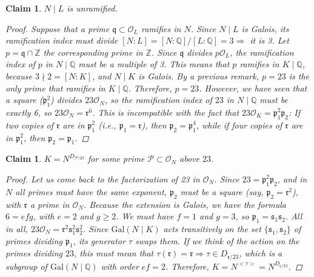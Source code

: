 \documentclass[11pt]{article}
\newtheorem{claim}[theorem]{Claim}
\theoremstyle{definition}
\begin{document}
    \begin{claim}
        $N \mid L$ is unramified.
        \begin{proof}

            
            Suppose that a prime $\mathfrak{q} \subset \mathcal{O}_L$ ramifies in $N$.
            Since $N \mid L$ is Galois, its ramification index must divide $[N:L] = [N : \mathbb{Q}] / [L : \mathbb{Q}] = 3 \Rightarrow$ it is 3.
            Let $p = \mathfrak{q} \cap \mathbb{Z}$ the corresponding prime in $\mathbb{Z}$.
            Since $\mathfrak{q}$ divides $p\mathcal{O}_L$, the ramification index of $p$ in $N \mid \mathbb{Q}$ must be a multiple of 3.
            This means that $p$ ramifies in $K \mid \mathbb{Q}$, because $3 \nmid 2 = [N:K]$, and $N \mid K$ is Galois.
            By a previous remark, $p = 23$ is the only prime that ramifies in $K \mid \mathbb{Q}$.
            Therefore, $p = 23$.
            However, we have seen that a square ($\mathfrak{p}_1^2$) divides $23 \mathcal{O}_N$,
            so the ramification index of $23$ in $N\mid \mathbb{Q}$ must be exactly 6, so $23\mathcal{O}_N = \mathfrak{r}^6$.
            This is incompatible with the fact that $23 \mathcal{O}_K = \mathfrak{p}_1^2 \mathfrak{p}_2$:
            If two copies of $\mathfrak{r}$ are in $\mathfrak{p}_1^2$ (i.e., $\mathfrak{p}_1 = \mathfrak{r}$), then $\mathfrak{p_2}=\mathfrak{p}_1^4$,
            while if four copies of $\mathfrak{r}$ are in $\mathfrak{p}_1^2$, then $\mathfrak{p}_2=\mathfrak{p}_1$.

        \end{proof}
    \end{claim}
    
    \begin{claim}
        $K = N^{D_{\mathcal{P}/23}}$ for some prime $\mathcal{P} \subset \mathcal{O}_N$ above $23$.
        \begin{proof}

            Let us come back to the factorization of 23 in $\mathcal{O}_N$.
            Since $23 = \mathfrak{p}_1^2 \mathfrak{p}_2$, and in $N$ all primes must have the same exponent, $\mathfrak{p}_2$ must be a square (say, $\mathfrak{p}_2 = \mathfrak{r}^2$),
            with $\mathfrak{r}$ a prime in $\mathcal{O}_N$.
            Because the extension is Galois, we have the formula $6=efg$, with $e = 2$ and $g \geq 2$.
            We must have $f = 1$ and $g = 3$, so $\mathfrak{p}_1 = \mathfrak{s}_1\mathfrak{s}_2$.
            All in all, $23 \mathcal{O}_N = \mathfrak{r}^2 \mathfrak{s}_1^2\mathfrak{s}_2^2$.
            Since $\text{Gal}(N\mid K)$ acts transitively on the set $\{\mathfrak{s}_1, \mathfrak{s}_2\}$ of primes dividing $\mathfrak{p}_1$,
            its generator $\tau$ swaps them.
            If we think of the action on the primes dividing $23$, this must mean that
            $\tau(\mathfrak{r}) = \mathfrak{r} \Rightarrow \tau \in D_{\mathfrak{r}/23}$,
            which is a subgroup of $\text{Gal}(N\mid\mathbb{Q})$
            with order $ef=2$.
            Therefore, $K = N^{<\tau>} = N^{D_{\mathfrak{r}/23}}$.

        \end{proof}
    \end{claim}
\end{document}
